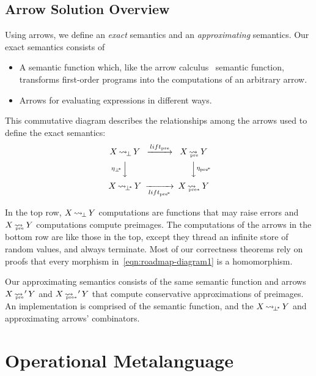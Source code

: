 \documentclass{llncs}
\newcommand{\arrow}{\rightsquigarrow}
\newcommand{\arrowlift}{\ensuremath{lift}}
\DeclareMathOperator{\botto}{\arrow_{\mspace{-3mu}\bot}}
\newcommand{\pre}{_\mathrm{pre}}
\DeclareMathOperator{\preto}{\arrow_{\mspace{-19mu}\pre}}
\newcommand{\liftpre}{\arrowlift\pre}
\newcommand{\pbot}{{\bot^{\mspace{-4mu}*}}}
\DeclareMathOperator{\pbotto}{\arrow_{\mspace{-3mu}\pbot}}
\newcommand{\ppre}{_\mathrm{pre^{\mspace{-2mu}*}}}
\DeclareMathOperator{\ppreto}{\arrow_{\mspace{-19mu}_{\mathrm{pre*}}}}
\newcommand{\liftppre}{\arrowlift\ppre}
\begin{document}
\subsection{Arrow Solution Overview}

\newcommand{\youarehere}[1]%
{%
\begin{equation}%
\begin{CD}%
X \botto Y   @>\liftpre>>   X \preto Y \\%
@V{\eta_\pbot}VV              @VV{\eta\ppre}V\\%
X \pbotto Y  @>>\liftppre>  X \ppreto Y%
\end{CD}%
\label{#1}%
\end{equation}%
}

Using arrows, we define an \emph{exact} semantics and an \emph{approximating} semantics.
Our exact semantics consists of
\begin{itemize}
	\item A semantic function which, like the arrow calculus~\cite{cit:lindley-2010jfp-arrow-calculus} semantic function, transforms first-order programs into the computations of an arbitrary arrow.
	\item Arrows for evaluating expressions in different ways.
\end{itemize}
This commutative diagram describes the relationships among the arrows used to define the exact semantics:
\youarehere{eqn:roadmap-diagram1}
In the top row, $X \botto Y$ computations are functions that may raise errors and $X \preto Y$ computations compute preimages.
The computations of the arrows in the bottom row are like those in the top, except they thread an infinite store of random values, and always terminate.
Most of our correctness theorems rely on proofs that every morphism in~\eqref{eqn:roadmap-diagram1} is a homomorphism.

Our approximating semantics consists of the same semantic function and arrows $X \preto' Y$ and $X \ppreto' Y$ that compute conservative approximations of preimages.
An implementation is comprised of the semantic function, and the $X \pbotto Y$ and approximating arrows' combinators.


\section{Operational Metalanguage}
\end{document}
